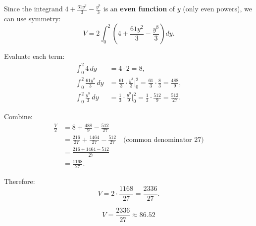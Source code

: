 \documentclass[12pt]{article}
\begin{document}
Since the integrand $4 + \frac{61 y^2}{3} - \frac{y^8}{3}$ is an
\textbf{even function} of $y$ (only even powers), we can use symmetry:
\[
  V = 2 \int_{0}^{2} \left(4 + \frac{61 y^2}{3} - \frac{y^8}{3}\right) dy.
\]

Evaluate each term:
\begin{align*}
  \int_{0}^{2} 4\, dy &= 4 \cdot 2 = 8, \\[6pt]
  \int_{0}^{2} \frac{61 y^2}{3}\, dy
    &= \frac{61}{3} \cdot \frac{y^3}{3}\bigg|_0^2
     = \frac{61}{3} \cdot \frac{8}{3}
     = \frac{488}{9}, \\[6pt]
  \int_{0}^{2} \frac{y^8}{3}\, dy
    &= \frac{1}{3} \cdot \frac{y^9}{9}\bigg|_0^2
     = \frac{1}{3} \cdot \frac{512}{9}
     = \frac{512}{27}.
\end{align*}

Combine:
\begin{align*}
  \frac{V}{2}
    &= 8 + \frac{488}{9} - \frac{512}{27} \\
    &= \frac{216}{27} + \frac{1464}{27} - \frac{512}{27}
     \quad\text{(common denominator 27)} \\
    &= \frac{216 + 1464 - 512}{27} \\
    &= \frac{1168}{27}.
\end{align*}

Therefore:
\[
  V = 2 \cdot \frac{1168}{27} = \frac{2336}{27}.
\]

\[
  \boxed{V = \dfrac{2336}{27} \approx 86.52}
\]
\end{document}
